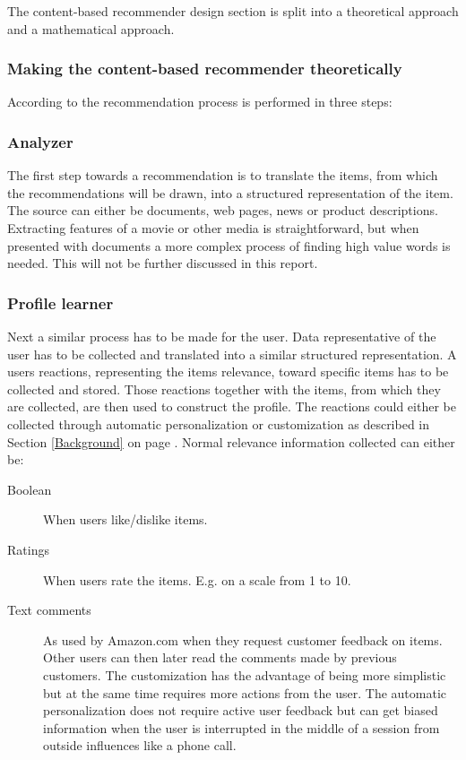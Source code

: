 The content-based recommender design section is split into a theoretical approach and a mathematical approach.

\subsubsection{Making the content-based recommender theoretically}

According to \cite{RecSysHandbook} the recommendation process is performed in three steps:

\subsubsection{Analyzer}

The first step towards a recommendation is to translate the items, from which the recommendations will be drawn, into a structured representation of the item. The source can either be documents, web pages, news or product descriptions. Extracting features of a movie or other media is straightforward, but when presented with documents a more complex process of finding high value words is needed. This will not be further discussed in this report.    
 
\subsubsection{Profile learner}

Next a similar process has to be made for the user. Data representative of the user has to be collected and translated into a similar structured representation. A users reactions, representing the items relevance, toward specific items has to be collected and stored. Those reactions together with the items, from which they are collected, are then used to construct the profile. The reactions could either be collected through automatic personalization or customization as described in Section \ref{Background} on page \pageref{Background}. Normal relevance information collected can either be:

\begin{description}
\item[Boolean] When users like/dislike items.


\item[Ratings] When users rate the items. E.g. on a scale from 1 to 10.


\item[Text comments] As used by Amazon.com when they request customer feedback on items. Other users can then later read the comments made by previous customers. The customization has the advantage of being more simplistic but at the same time requires more actions from the user. The automatic personalization does not require active user feedback but can get biased information when the user is interrupted in the middle of a session from outside influences like a phone call.
\end{description}

